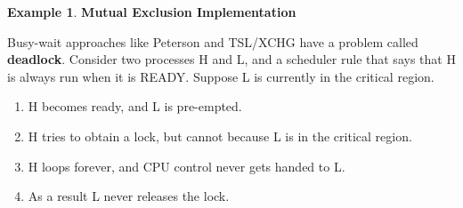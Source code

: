 \documentclass[11pt,a4paper]{article}
\theoremstyle{definition}
\newtheorem{example}{Example}[section]
\newenvironment{myitemize}
{ \begin{itemize}
    \setlength{\itemsep}{5pt}
    \setlength{\parskip}{0pt}
    \setlength{\parsep}{0pt}     }
{ \end{itemize}                  }
\newenvironment{myenumerate}
{ \begin{enumerate}
    \setlength{\itemsep}{5pt}
    \setlength{\parskip}{0pt}
    \setlength{\parsep}{0pt}     }
{ \end{enumerate}                }
\begin{document}
\begin{example}{\textbf{Mutual Exclusion Implementation}}
\begin{myitemize}
\begin{myitemize}
		\end{myitemize}
		\begin{tcolorbox}
			\textsf{Busy-wait approaches like Peterson and TSL/XCHG have a problem called \textbf{deadlock}.} Consider two processes H and L, and a scheduler rule that says that H is always run when it is READY. Suppose L is currently in the critical region.
			\begin{myenumerate}
				\item H becomes ready, and L is pre-empted.
				\item H tries to obtain a lock, but cannot because L is in the critical region.
				\item H loops forever, and CPU control never gets handed to L.
				\item As a result L never releases the lock.
			\end{myenumerate}
			

\end{tcolorbox}
\end{myitemize}
\end{example}
\end{document}
